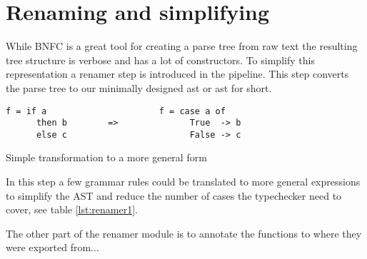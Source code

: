 \section{Renaming and simplifying}


While BNFC is a great tool for creating a parse tree from raw text the resulting 
tree structure is verbose and has a lot of constructors. To simplify this representation 
a renamer step is introduced in the pipeline. This step converts the parse tree
to our minimally designed \acrlong{ast} or \acrshort{ast} for short. 

\begin{table}
\begin{lstlisting} 
f = if a                      f = case a of
      then b        =>              True  -> b
      else c                        False -> c
\end{lstlisting}
\caption{Simple transformation to a more general form}
\label{lst:renamer1}
\end{table}

In this step a few grammar rules could be translated to more general expressions
to simplify the AST and reduce the number of cases the typechecker need to cover, see
table \ref{lst:renamer1}.

The other part of the renamer module is to annotate the functions to where they
were exported from...

